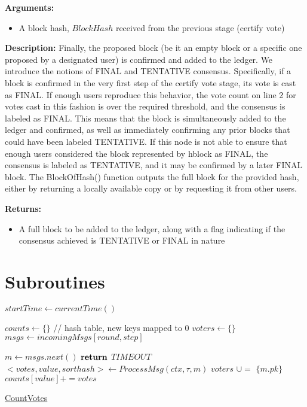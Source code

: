 \documentclass[10pt,a4paper]{article}
\begin{document}
\textbf{Arguments:}
\begin{itemize}
    \item A block hash, $BlockHash$ received from the previous stage (certify vote)
  \end{itemize}

\textbf{Description:}
Finally, the proposed block (be it an empty block or a specific one 
proposed by a designated user) is confirmed and added to the ledger.
We introduce the notions of FINAL and TENTATIVE consensus.
Specifically, if a block is confirmed in the very first step of the 
certify vote stage, its vote is cast as FINAL.
If enough users reproduce this behavior, the vote count on line 2 for 
votes cast in this fashion is over the required threshold, and the 
consensus is labeled as FINAL.
This means that the block is simultaneously added to the ledger and 
confirmed, as well as immediately confirming any prior blocks that 
could have been labeled TENTATIVE.
If this node is not able to ensure that enough users considered the 
block represented by hblock as FINAL, the consensus is labeled as 
TENTATIVE, and it may be confirmed by a later FINAL block.
The BlockOfHash() function outputs the full block for the provided 
hash, either by returning a locally available copy or by requesting 
it from other users.

\textbf{Returns:}
\begin{itemize}
    \item A full block to be added to the ledger, along with a flag indicating if
    the consensus achieved is TENTATIVE or FINAL in nature
  \end{itemize}

\section{Subroutines}

\begin{algorithm}
    \begin{algorithmic}[H]

    \State $startTime \gets currentTime()$

    \State $counts \gets \{\}$ // hash table, new keys mapped to 0
    \State $voters \gets \{\}$
    \State $msgs \gets incomingMsgs[round,step]$

        \State $m \gets msgs.next()$
                \State $\Return$ $TIMEOUT$
            \EndIf
        \Else
            \State $<votes, value, sorthash> \gets ProcessMsg(ctx, \tau, m)$
            \State $voters$ $\cup=$ $\{m.pk\}$
            \State $counts[value] += votes$
        \EndIf
    \EndWhile
    \EndFunction
    \end{algorithmic}
    \caption{\underline{CountVotes}}
\end{algorithm}
\end{document}
